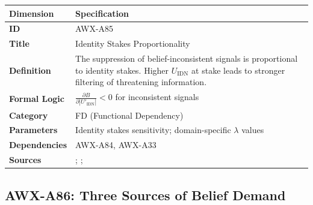 \begin{table}[htbp]
\small
\begin{tabular}{p{3cm}p{11cm}}
\toprule
\textbf{Dimension} & \textbf{Specification} \\
\midrule
\textbf{ID} & AWX-A85 \\
\textbf{Title} & Identity Stakes Proportionality \\
\textbf{Definition} & The suppression of belief-inconsistent signals is proportional to identity stakes. Higher $U_{\text{IDN}}$ at stake leads to stronger filtering of threatening information. \\
\textbf{Formal Logic} & $\frac{\partial B}{\partial |U'_{\text{IDN}}|} < 0$ for inconsistent signals \\
\textbf{Category} & FD (Functional Dependency) \\
\textbf{Parameters} & Identity stakes sensitivity; domain-specific $\lambda$ values \\
\textbf{Dependencies} & AWX-A84, AWX-A33 \\
\textbf{Sources} & \citet{benabou2011identity}; \citet{PAP-akerlof2000identity}; \citet{sherman2000accepting} \\
\bottomrule
\end{tabular}
\end{table}


\subsection{AWX-A86: Three Sources of Belief Demand}

